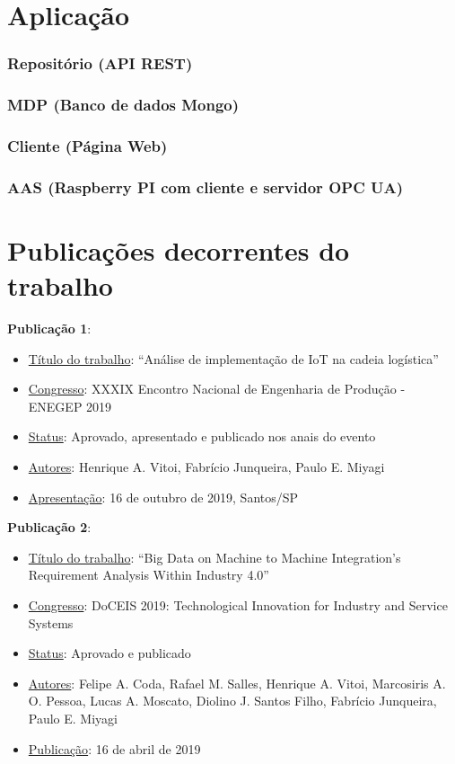 \documentclass[
	12pt,				%
	oneside,			%
	a4paper,			%
	english,			%
	brazil				%
]{abntex2}
\begin{document}
	\lipsum[1-1]

\chapter{Aplicação}

	\subsection{Repositório (API REST)}
	
	\subsection{MDP (Banco de dados Mongo)}
	
	\subsection{Cliente (Página Web)}
	
	\subsection{AAS (Raspberry PI com cliente e servidor OPC UA)}

\lipsum[1-1]
\chapter{Publicações decorrentes do trabalho}

	\textbf{Publicação 1}:
	\begin{itemize}
		\item \underline{Título do trabalho}: “Análise de implementação de IoT na cadeia logística”
		\item \underline{Congresso}: XXXIX Encontro Nacional de Engenharia de Produção - ENEGEP 2019
		\item \underline{Status}: Aprovado, apresentado e publicado nos anais do evento
		\item \underline{Autores}:  Henrique A. Vitoi, Fabrício Junqueira, Paulo E. Miyagi
		\item \underline{Apresentação}: 16 de outubro de 2019, Santos/SP
	\end{itemize}
	
	\bigskip
	

	\textbf{Publicação 2}:
	\begin{itemize}
		\item \underline{Título do trabalho}: “Big Data on Machine to Machine Integration's Requirement Analysis Within Industry 4.0”
		\item \underline{Congresso}: DoCEIS 2019: Technological Innovation for Industry and Service Systems
		\item \underline{Status}: Aprovado e publicado
		\item \underline{Autores}:  Felipe A. Coda, Rafael M. Salles, Henrique A. Vitoi, Marcosiris A. O. Pessoa, Lucas A. Moscato, Diolino J. Santos Filho, Fabrício Junqueira, Paulo E. Miyagi
		\item \underline{Publicação}: 16 de abril de 2019
	\end{itemize}
\end{document}

